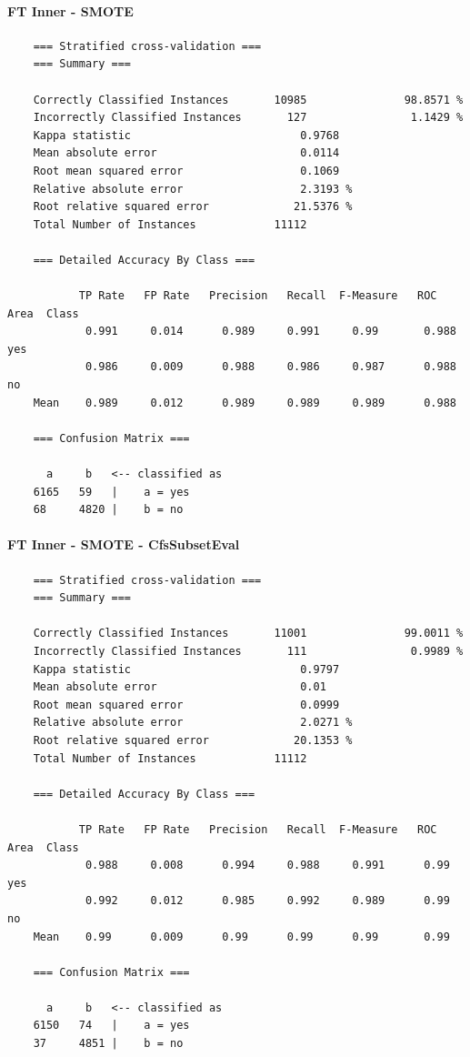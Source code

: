 \paragraph{FT Inner - SMOTE}
{\footnotesize
	\begin{verbatim}
	=== Stratified cross-validation ===
	=== Summary ===
	
	Correctly Classified Instances       10985               98.8571 %
	Incorrectly Classified Instances       127                1.1429 %
	Kappa statistic                          0.9768
	Mean absolute error                      0.0114
	Root mean squared error                  0.1069
	Relative absolute error                  2.3193 %
	Root relative squared error             21.5376 %
	Total Number of Instances            11112     
	
	=== Detailed Accuracy By Class ===
	
	       TP Rate   FP Rate   Precision   Recall  F-Measure   ROC Area  Class
	        0.991     0.014      0.989     0.991     0.99       0.988    yes
	        0.986     0.009      0.988     0.986     0.987      0.988    no
	Mean    0.989     0.012      0.989     0.989     0.989      0.988
	
	=== Confusion Matrix ===
	
	  a     b   <-- classified as
	6165   59   |    a = yes
	68     4820 |    b = no	
	\end{verbatim}
}

\paragraph{FT Inner - SMOTE - CfsSubsetEval}
{\footnotesize
	\begin{verbatim}
	=== Stratified cross-validation ===
	=== Summary ===
	
	Correctly Classified Instances       11001               99.0011 %
	Incorrectly Classified Instances       111                0.9989 %
	Kappa statistic                          0.9797
	Mean absolute error                      0.01  
	Root mean squared error                  0.0999
	Relative absolute error                  2.0271 %
	Root relative squared error             20.1353 %
	Total Number of Instances            11112     
	
	=== Detailed Accuracy By Class ===
	
	       TP Rate   FP Rate   Precision   Recall  F-Measure   ROC Area  Class
	        0.988     0.008      0.994     0.988     0.991      0.99     yes
	        0.992     0.012      0.985     0.992     0.989      0.99     no
	Mean    0.99      0.009      0.99      0.99      0.99       0.99 
	
	=== Confusion Matrix ===
	
	  a     b   <-- classified as
	6150   74   |    a = yes
	37     4851 |    b = no
	\end{verbatim}
}

